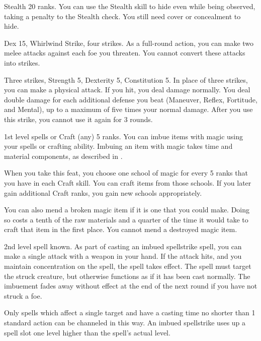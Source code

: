 \featpre Stealth 20 ranks.
\featben You can use the Stealth skill to hide even while being observed, taking a  penalty to the Stealth check.
You still need cover or concealment to hide.

\featpres Dex 15, Whirlwind Strike, four strikes.
\featben As a full-round action, you can make two melee attacks against each foe you threaten. You cannot convert these attacks into strikes.

\featpre Three strikes, Strength 5, Dexterity 5, Constitution 5.
\featben In place of three strikes, you can make a physical attack.
If you hit, you deal damage normally.
You deal double damage for each additional defense you beat (Maneuver, Reflex, Fortitude, and Mental), up to a maximum of five times your normal damage.
After you use this strike, you cannot use it again for 3 rounds.

\featpre 1st level spells or Craft (any) 5 ranks.
\featben You can imbue items with magic using your spells or crafting ability.
Imbuing an item with magic takes time and material components, as described in .

When you take this feat, you choose one school of magic for every 5 ranks that you have in each Craft skill.
You can craft items from those schools.
If you later gain additional Craft ranks, you gain new schools appropriately.

You can also mend a broken magic item if it is one that you could make.
Doing so costs a tenth of the raw materials and a quarter of the time it would take to craft that item in the first place.
You cannot mend a destroyed magic item.

\featpre 2nd level spell known.
\featben As part of casting an imbued spellstrike spell, you can make a single attack with a weapon in your hand.
If the attack hits, and you maintain concentration on the spell, the spell takes effect.
The spell must target the struck creature, but otherwise functions as if it has been cast normally.
The imbuement fades away without effect at the end of the next round if you have not struck a foe.

Only spells which affect a single target and have a casting time no shorter than 1 standard action can be channeled in this way.
An imbued spellstrike uses up a spell slot one level higher than the spell's actual level.

